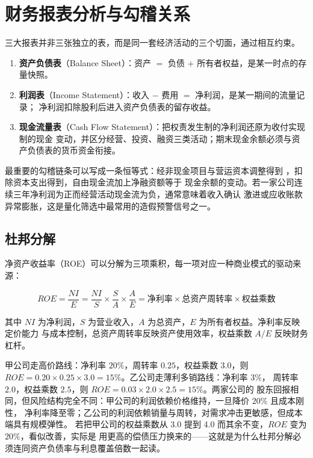 \section{财务报表分析与勾稽关系}

三大报表并非三张独立的表，而是同一套经济活动的三个切面，通过相互约束。

\begin{enumerate}[leftmargin=*]
  \item \textbf{资产负债表}（Balance Sheet）：资产 $=$ 负债 $+$ 所有者权益，是某一时点的存量快照。
  \item \textbf{利润表}（Income Statement）：收入 $-$ 费用 $=$ 净利润，是某一期间的流量记录；
        净利润扣除股利后进入资产负债表的留存收益。
  \item \textbf{现金流量表}（Cash Flow Statement）：把权责发生制的净利润还原为收付实现制的现金
        变动，并区分经营、投资、融资三类活动；期末现金余额必须与资产负债表的货币资金衔接。
\end{enumerate}

最重要的勾稽链条可以写成一条恒等式：经非现金项目与营运资本调整得到
，扣除资本支出得到，自由现金流加上净融资额等于
现金余额的变动。若一家公司连续三年净利润为正而经营活动现金流为负，通常意味着收入确认
激进或应收账款异常膨胀，这是量化筛选中最常用的造假预警信号之一。

\subsection{杜邦分解}

净资产收益率（ROE）可以分解为三项乘积，每一项对应一种商业模式的驱动来源：

\begin{equation}\label{eq:01-dupont}
  ROE = \frac{NI}{E} = \frac{NI}{S}\times\frac{S}{A}\times\frac{A}{E}
      = \text{净利率} \times \text{总资产周转率} \times \text{权益乘数}
\end{equation}

其中 $NI$ 为净利润，$S$ 为营业收入，$A$ 为总资产，$E$ 为所有者权益。净利率反映定价能力
与成本控制，总资产周转率反映资产使用效率，权益乘数 $A/E$ 反映财务杠杆。

\begin{example}\label{ex:01-dupont}
甲公司走高价路线：净利率 $20\%$，周转率 $0.25$，权益乘数 $3.0$，则
$ROE = 0.20 \times 0.25 \times 3.0 = 15\%$。乙公司走薄利多销路线：净利率 $3\%$，
周转率 $2.0$，权益乘数 $2.5$，则 $ROE = 0.03 \times 2.0 \times 2.5 = 15\%$。两家公司的
股东回报相同，但风险结构完全不同：甲公司的利润依赖价格维持，一旦降价 $20\%$ 且成本刚性，
净利率降至零；乙公司的利润依赖销量与周转，对需求冲击更敏感，但成本端具有规模弹性。
若把甲公司的权益乘数从 3.0 提到 4.0 而其余不变，$ROE$ 变为 $20\%$，看似改善，实际是
用更高的偿债压力换来的——这就是为什么杜邦分解必须连同资产负债率与利息覆盖倍数一起读。
\end{example}

